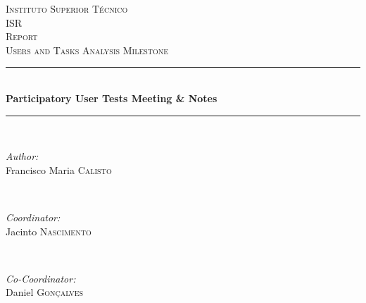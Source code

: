 \begin{titlepage}

\newcommand{\HRule}{\rule{\linewidth}{0.5mm}} %

\center %
 

\textsc{\LARGE Instituto Superior T\'{e}cnico}\\[1.5cm]
\textsc{\Large ISR}\\[0.5cm]
\textsc{\large Report}\\[0.25cm]
\textsc{\small Users and Tasks Analysis Milestone}\\[0.25cm]


\HRule \\[0.5cm]
{ \large \bfseries Participatory User Tests Meeting \& Notes}\\[0.25cm] %
\HRule \\[0.5cm]
 

\begin{minipage}{0.4\textwidth}
\begin{flushleft} \large
\emph{Author:}\\
Francisco Maria \textsc{Calisto} %
\end{flushleft}
\end{minipage}
~
\begin{minipage}{0.4\textwidth}
\begin{flushright} \large
\emph{Coordinator:} \\
Jacinto \textsc{Nascimento} %
\end{flushright}
~
\begin{flushright} \large
\emph{Co-Coordinator:} \\
Daniel \textsc{Gon\c{c}alves} %
\end{flushright}
\end{minipage}\\[2cm]


\end{titlepage}

